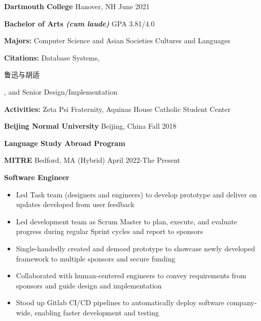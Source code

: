 \documentclass[10pt,a4paper,ragged2e,withhyper]{altacv}
\begin{document}
\begin{paracol}{2}


\large\color{emphasis}\textbf{Dartmouth College} \small\faUniversity Hanover, NH
\hfill\small\faGraduationCap June 2021\par
\textbf{\color{subheading}Bachelor of Arts \textit{(cum laude)}} \hfill GPA 3.81/4.0\par
\textbf{Majors:} Computer Science and Asian Societies Cultures and Languages \par
\textbf{Citations:} Database Systems, \begin{CJK*}{UTF8}{gbsn}鲁迅与胡适\end{CJK*}, and Senior Design/Implementation \par
\textbf{Activities:} Zeta Psi Fraternity, Aquinas House Catholic Student Center \par
\medskip
\large\color{emphasis}\textbf{Beijing Normal University} \small\faUniversity Beijing, China
\hfill\small\faGraduationCap Fall 2018\par
\textbf{\color{subheading}Language Study Abroad Program}\par


\large\color{emphasis}\textbf{MITRE} \small\faSuitcase Bedford, MA (Hybrid)
\hfill\small\faCalendar April 2022-The Present\par
\textbf{\color{subheading}Software Engineer}\par
\smallskip
\normalsize
\begin{itemize}
\item Led Task team (designers and engineers) to develop prototype and deliver on updates developed from user feedback
\item Led development team as Scrum Master to plan, execute, and evaluate progress during regular Sprint cycles and report to sponsors
\item Single-handedly created and demoed prototype to showcase newly developed framework to multiple sponsors and secure funding
\item Collaborated with human-centered engineers to convey requirements from sponsors and guide design and implementation
\item Stood up Gitlab CI/CD pipelines to automatically deploy software company-wide, enabling faster development and testing
\end{itemize}
\divider


\end{paracol}
\end{document}
